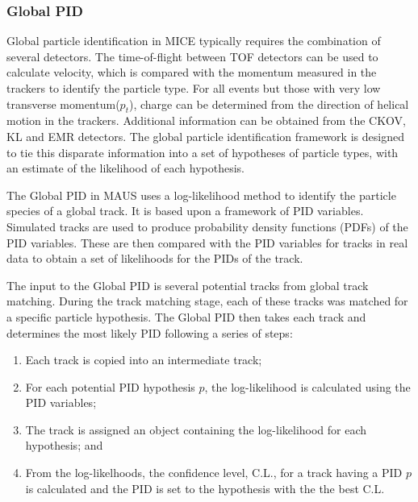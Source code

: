 \documentclass[11pt]{article}
\begin{document}


\subsubsection{Global PID} 

Global particle identification in MICE typically requires the combination of several detectors. The time-of-flight between TOF detectors can be used to calculate velocity, which is compared 
with the momentum measured in the trackers to identify the particle type. For all events but those with very low transverse momentum($p_t$), charge can be determined from the direction of helical motion in the trackers. Additional information can be obtained from the CKOV, KL and EMR detectors. The global particle identification framework is designed to tie this disparate information into a set of hypotheses of particle types, with an estimate of the likelihood of each hypothesis. 


The Global PID in MAUS uses a log-likelihood method to identify the particle species of a global track. It is based upon a framework of PID variables. Simulated tracks are used to produce probability density functions (PDFs) of the PID variables. These are then compared with the PID variables for tracks in real data to obtain a set of likelihoods for the PIDs of the track.

The input to the Global PID is several potential tracks from global track matching. During the track matching stage, each of these tracks was matched for a specific particle hypothesis. The Global PID then takes each track and determines the most likely PID following a series of steps:

\begin{enumerate}
\item Each track is copied into an intermediate track;
\item For each potential PID hypothesis $p$, the log-likelihood is calculated using the PID variables;
\item The track is assigned an object containing the log-likelihood for each hypothesis; and
\item From the log-likelhoods, the confidence level, C.L., for a track having a PID $p$ is calculated and the PID is set to the hypothesis with the the best C.L.
\end{enumerate}
\end{document}
